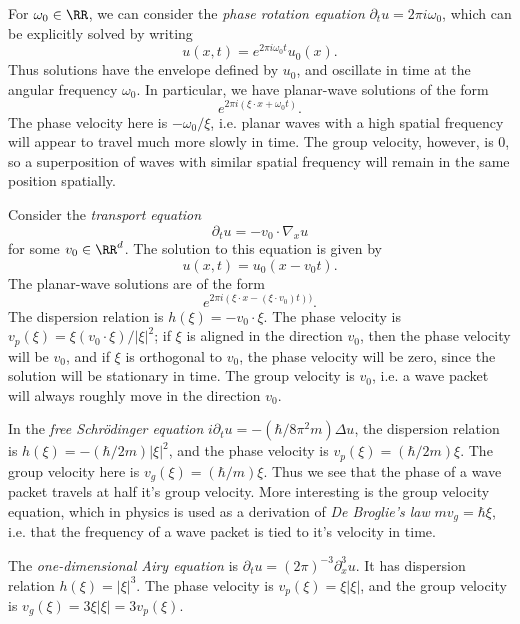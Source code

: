 \begin{example}
	For $\omega_0 \in \RR$, we can consider the \emph{phase rotation equation} $\partial_t u = 2 \pi i \omega_0$, which can be explicitly solved by writing
	\[ u(x,t) = e^{2 \pi i \omega_0 t} u_0(x). \]
	Thus solutions have the envelope defined by $u_0$, and oscillate in time at the angular frequency $\omega_0$. In particular, we have planar-wave solutions of the form
	\[ e^{2 \pi i (\xi \cdot x + \omega_0 t)}. \]
	The phase velocity here is $- \omega_0 / \xi$, i.e. planar waves with a high spatial frequency will appear to travel much more slowly in time. The group velocity, however, is $0$, so a superposition of waves with similar spatial frequency will remain in the same position spatially.
\end{example}

\begin{example}
	Consider the \emph{transport equation}
	\[ \partial_t u = - v_0 \cdot \nabla_x u \]
	for some $v_0 \in \RR^d$. The solution to this equation is given by
	\[ u(x,t) = u_0(x - v_0 t). \]
	The planar-wave solutions are of the form
	\[ e^{2 \pi i (\xi \cdot x - (\xi \cdot v_0) t))}. \]
	The dispersion relation is $h(\xi) = - v_0 \cdot \xi$. The phase velocity is $v_p(\xi) = \xi (v_0 \cdot \xi) / |\xi|^2$; if $\xi$ is aligned in the direction $v_0$, then the phase velocity will be $v_0$, and if $\xi$ is orthogonal to $v_0$, the phase velocity will be zero, since the solution will be stationary in time. The group velocity is $v_0$, i.e. a wave packet will always roughly move in the direction $v_0$.
\end{example}

\begin{example}
	In the \emph{free Schr\"{o}dinger equation} $i \partial_t u = - (\hbar / 8 \pi^2 m) \Delta u$, the dispersion relation is $h(\xi) = - (\hbar / 2 m) |\xi|^2$, and the phase velocity is $v_p(\xi) = (\hbar / 2 m) \xi$. The group velocity here is $v_g(\xi) = (\hbar / m) \xi$. Thus we see that the phase of a wave packet travels at half it's group velocity. More interesting is the group velocity equation, which in physics is used as a derivation of \emph{De Broglie's law} $mv_g = \hbar \xi$, i.e. that the frequency of a wave packet is tied to it's velocity in time.
\end{example}

\begin{example}
	The \emph{one-dimensional Airy equation} is $\partial_t u = (2 \pi)^{-3} \partial_x^3 u$. It has dispersion relation $h(\xi) = |\xi|^3$. The phase velocity is $v_p(\xi) = \xi |\xi|$, and the group velocity is $v_g(\xi) = 3 \xi |\xi| = 3 v_p(\xi)$.
\end{example}

